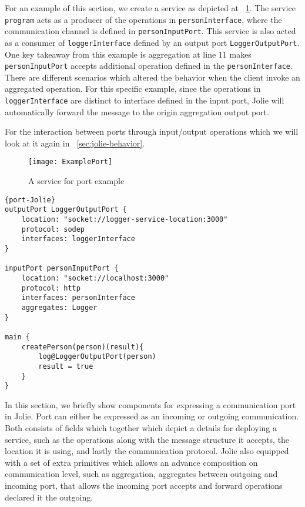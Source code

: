 \FloatBarrier

For an example of this section, we create a service as depicted at ~\ref{list:example-port-graphic}.
The service \texttt{program} acts as a producer of the operations in \texttt{personInterface}, where the communication channel is defined in \texttt{personInputPort}.
This service is also acted as a consumer of \texttt{loggerInterface} defined by an output port \texttt{LoggerOutputPort}.
One key takeaway from this example is aggregation at line 11 makes \texttt{personInputPort} accepts additional operation defined in the \texttt{personInterface}. There are different scenarios which altered the behavior when the client invoke an aggregated operation. For this specific example, since the operations in \texttt{loggerInterface} are distinct to interface defined in the input port, Jolie will automatically forward the message to the origin aggregation output port.

For the interaction between ports through input/output operations which we will look at it again in ~\ref{sec:jolie-behavior}.

\begin{figure}[ht]
    \texttt{[image: ExamplePort]}
    \centering
    \caption{A service for port example}
    \label{list:example-port-graphic}
\end{figure}

\begin{listing}[ht]

    \lstset{language=Jolie,
        style=codeStyle,
        numbers=left,
        firstnumber=1
    }
    \begin{lstlisting}[frame=tlrb, caption= {Jolie Port declaration example}, label={list:example-port} ]{port-Jolie}
outputPort LoggerOutputPort {
    location: "socket://logger-service-location:3000"
    protocol: sodep
    interfaces: loggerInterface
}

inputPort personInputPort {
    location: "socket://localhost:3000"
    protocol: http
    interfaces: personInterface
    aggregates: Logger
}

main {
    createPerson(person)(result){
        log@LoggerOutputPort(person)
        result = true
    }
}
\end{lstlisting}
\end{listing}

In this section, we briefly show components for expressing a communication port in Jolie. Port can either be expressed as an incoming or outgoing communication. Both consists of fields which together which depict a details for deploying a service, such as the operations along with the message structure it accepts, the location it is using, and lastly the communication protocol. Jolie also equipped with a set of extra primitives which allows an advance composition on communication level, such as aggregation, aggregates between outgoing and incoming port, that allows the incoming port accepts and forward operations declared it the outgoing.

\FloatBarrier
